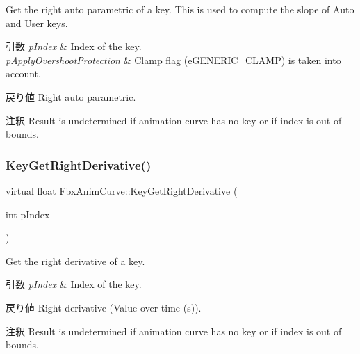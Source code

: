 Get the right auto parametric of a key. This is used to compute the slope of Auto and User keys. 
\begin{DoxyParams}{引数}
{\em p\+Index} & Index of the key. \\
\hline
{\em p\+Apply\+Overshoot\+Protection} & Clamp flag (e\+G\+E\+N\+E\+R\+I\+C\+\_\+\+C\+L\+A\+MP) is taken into account. \\
\hline
\end{DoxyParams}
\begin{DoxyReturn}{戻り値}
Right auto parametric. 
\end{DoxyReturn}
\begin{DoxyRemark}{注釈}
Result is undetermined if animation curve has no key or if index is out of bounds. 
\end{DoxyRemark}
\mbox{\label{class_fbx_anim_curve_a8fb62fd9043cccbc129fad343d1610ba}} 
\subsubsection{\texorpdfstring{Key\+Get\+Right\+Derivative()}{KeyGetRightDerivative()}}
{\footnotesize\ttfamily virtual float Fbx\+Anim\+Curve\+::\+Key\+Get\+Right\+Derivative (\begin{DoxyParamCaption}\item[{int}]{p\+Index }\end{DoxyParamCaption})\hspace{0.3cm}{\ttfamily [pure virtual]}}

Get the right derivative of a key. 
\begin{DoxyParams}{引数}
{\em p\+Index} & Index of the key. \\
\hline
\end{DoxyParams}
\begin{DoxyReturn}{戻り値}
Right derivative (Value over time (s)). 
\end{DoxyReturn}
\begin{DoxyRemark}{注釈}
Result is undetermined if animation curve has no key or if index is out of bounds. 
\end{DoxyRemark}
\mbox{\label{class_fbx_anim_curve_a3c586d4f3cdcfbccc9fadf99bce03fd5}} 
